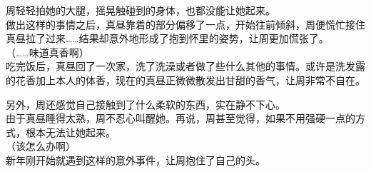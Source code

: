 周轻轻拍她的大腿，摇晃触碰到的身体，也都没能让她起来。\\

做出这样的事情之后，真昼靠着的部分偏移了一点，开始往前倾斜，周便慌忙接住真昼拉了过来……结果却意外地形成了抱到怀里的姿势，让周更加慌张了。\\

（……味道真香啊）\\

吃完饭后，真昼回了一次家，洗了洗澡或者做了些什么其他的事情。或许是洗发露的花香加上本人的体香，现在的真昼正微微散发出甘甜的香气，让周非常不自在。

另外，周还感觉自己接触到了什么柔软的东西，实在静不下心。\\

由于真昼睡得太熟，周不忍心叫醒她。再说，周甚至觉得，如果不用强硬一点的方式，根本无法让她起来。\\

（该怎么办啊）\\

新年刚开始就遇到这样的意外事件，让周抱住了自己的头。
